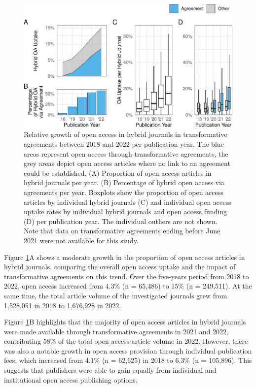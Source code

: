 \documentclass[a4paper,man,floatsintext,longtable,noextraspace,12pt]{apa6}
\begin{document}
\begin{figure}[ht!]

{\centering \includegraphics[width=0.99\linewidth,]{fig/results_overview-1} 

}

\caption{Relative growth of open access in hybrid journals in transformative agreements between 2018 and 2022 per publication year. The blue areas represent open access through transformative agreements, the grey areas depict open access articles where no link to an agreement could be established. (A) Proportion of open access articles in hybrid journals per year. (B) Percentage of hybrid open access via agreements per year. Boxplots show the proportion of open access articles by individual hybrid journals (C) and individual open access uptake rates by individual hybrid journals and open access funding (D) per publication year. The individual outliers are not shown. Note that data on transformative agreements ending before June 2021 were not available for this study.}\label{fig:results_overview}
\end{figure}

Figure \ref{fig:results_overview}A shows a moderate growth in the
proportion of open access articles in hybrid journals, comparing the
overall open access uptake and the impact of transformative agreements
on this trend. Over the five-years period from 2018 to 2022, open access
increased from 4.3\% (n = 65,486) to 15\% (n = 249,511). At the same
time, the total article volume of the investigated journals grew from
1,528,051 in 2018 to 1,676,928 in 2022.

Figure \ref{fig:results_overview}B highlights that the majority of open
access articles in hybrid journals were made available through
transformative agreements in 2021 and 2022, contributing 58\% of the
total open access article volume in 2022. However, there was also a
notable growth in open access provision through individual publication
fees, which increased from 4.1\% (n = 62,625) in 2018 to 6.3\% (n =
105,896). This suggests that publishers were able to gain equally from
individual and institutional open access publishing options.
\end{document}
